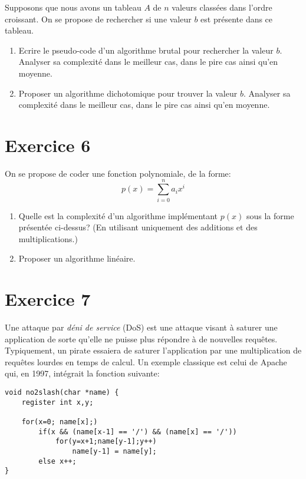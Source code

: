 \documentclass[a4paper,10pt]{article}
\begin{document}
Supposons que nous avons un tableau $A$ de $n$ valeurs classées dans l'ordre
croissant. On se propose de rechercher si une valeur $b$ est présente dans ce
tableau.

\begin{enumerate}

\item Ecrire le pseudo-code d'un algorithme brutal pour rechercher la valeur
$b$.  Analyser sa complexité dans le meilleur cas, dans le pire cas ainsi qu'en
moyenne.

\item Proposer un algorithme dichotomique pour trouver la valeur $b$. Analyser
sa complexité dans le meilleur cas, dans le pire cas ainsi qu'en moyenne.

\end{enumerate}

\section*{Exercice 6}

On se propose de coder une fonction polynomiale, de la forme:
$$
p(x) = \sum_{i=0}^n a_i x^i
$$

\begin{enumerate}

\item Quelle est la complexité d'un algorithme implémentant $p(x)$ sous la forme présentée ci-dessus? (En utilisant uniquement des additions et des multiplications.)

\item Proposer un algorithme linéaire.

\end{enumerate}

\section*{Exercice 7}

Une attaque par \textit{déni de service} (DoS) est une attaque visant à saturer
une application de sorte qu'elle ne puisse plus répondre à de nouvelles
requêtes. Typiquement, un pirate essaiera de saturer l'application par une
multiplication de requêtes lourdes en temps de calcul. Un exemple classique est
celui de Apache qui, en 1997, intégrait la fonction suivante:

\begin{verbatim}
void no2slash(char *name) {
    register int x,y;

    for(x=0; name[x];)
        if(x && (name[x-1] == '/') && (name[x] == '/'))
            for(y=x+1;name[y-1];y++)
                name[y-1] = name[y];
        else x++;
}
\end{verbatim}
\end{document}

